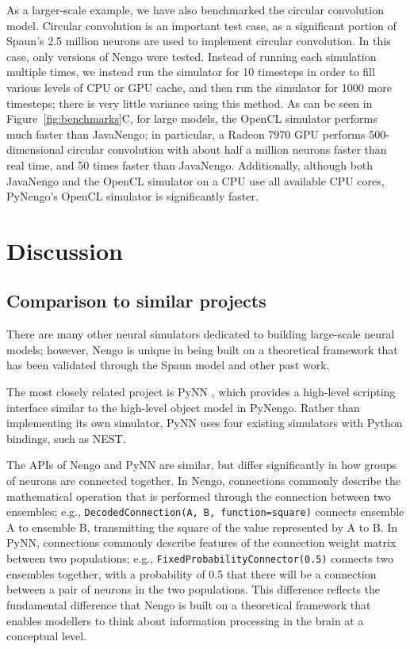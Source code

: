 \documentclass{frontiersSCNS}
\begin{document}
As a larger-scale example,
we have also benchmarked
the circular convolution model.
Circular convolution is an important test case,
as a significant portion of Spaun's
2.5 million neurons are used to
implement circular convolution.
In this case, only versions of Nengo
were tested.
Instead of running each simulation multiple times,
we instead run the simulator for 10 timesteps
in order to fill various levels of CPU or GPU cache,
and then run the simulator for 1000 more timesteps;
there is very little variance using this method.
As can be seen in Figure~\ref{fig:benchmarks}C,
for large models, the OpenCL simulator
performs much faster than JavaNengo;
in particular, a Radeon 7970 GPU performs
500-dimensional circular convolution
with about half a million neurons
faster than real time,
and 50 times faster than JavaNengo.
Additionally, although both JavaNengo
and the OpenCL simulator on a CPU
use all available CPU cores,
PyNengo's OpenCL simulator is significantly faster.

\clearpage

\section{Discussion}

\subsection{Comparison to similar projects}

There are many other neural simulators
dedicated to building large-scale neural models;
however, Nengo is unique in being built
on a theoretical framework
that has been validated
through the Spaun model and other past work.

The most closely related project is PyNN
\citep{davison2008},
which provides a high-level scripting
interface similar to the
high-level object model in PyNengo.
Rather than implementing its
own simulator, PyNN uses four existing
simulators with Python bindings,
such as NEST.

The APIs of Nengo and PyNN are similar,
but differ significantly
in how groups of neurons are connected together.
In Nengo, connections commonly describe
the mathematical operation that is performed
through the connection between
two ensembles;
e.g., \texttt{DecodedConnection(A, B,
function=square)} connects ensemble A
to ensemble B, transmitting the square of
the value represented by A to B.
In PyNN, connections commonly describe
features of the connection weight matrix
between two populations;
e.g., \texttt{FixedProbabilityConnector(0.5)}
connects two ensembles together,
with a probability of 0.5
that there will be a connection
between a pair of neurons in the two populations.
This difference reflects the
fundamental difference that Nengo
is built on a theoretical framework
that enables modellers to think
about information processing in the brain
at a conceptual level.
\end{document}
